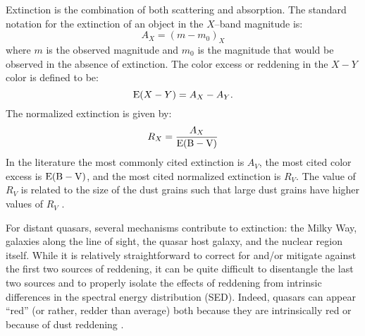Extinction is the combination of both scattering and absorption.  The standard notation for the extinction of an object in the $X$--band magnitude is:
\begin{equation}
 A_X = (m-m_0)_X
\end{equation}
where $m$ is the observed magnitude and $m_0$ is the magnitude that would be observed in the absence of extinction. The color excess or reddening in the $X-Y$ color is defined to be:
\begin{equation}
 {\rm E}(X-Y) = A_X-A_Y.
\end{equation}
The normalized extinction is given by:
\begin{equation}
 R_X = \frac{A_X}{\rm E(B-V)}
\end{equation}
In the literature the most commonly cited extinction is $A_V$, the most cited color excess is ${\rm E(B-V)}$, and the most cited normalized extinction is $R_V$.  The value of $R_V$ is related to the size of the dust grains such that large dust grains have higher values of $R_V$ \citep{Draine:2003}.


For distant quasars, several mechanisms contribute to extinction: the Milky Way, galaxies along the line of sight, the quasar host galaxy, and the nuclear region itself.  While it is relatively straightforward to correct for and/or mitigate against the first two sources of reddening, it can be quite difficult to disentangle the last two sources and to properly isolate the effects of reddening from intrinsic differences in the spectral energy distribution (SED). Indeed, quasars can appear ``red'' (or rather, redder than average) both because they are intrinsically red or because of dust reddening \citep{Richards:2003}.

